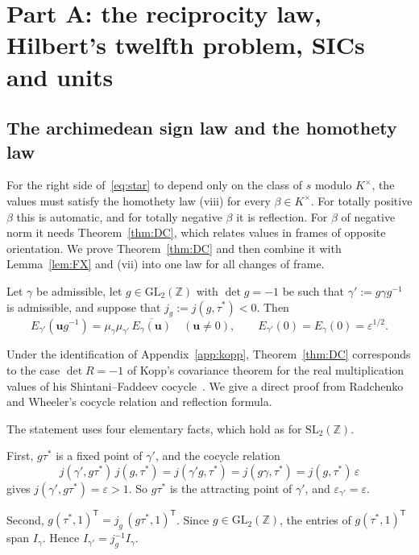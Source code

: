 \documentclass[11pt]{amsart}
\numberwithin{equation}{section}
\theoremstyle{plain}
\newenvironment{lthm}[1]{\renewcommand\thelthminner{#1}\lthminner}{\endlthminner}
\theoremstyle{definition}
\theoremstyle{remark}
\begin{document}
\section{Part A: the reciprocity law, Hilbert's twelfth problem, SICs and units}\label{sec:partA}

\subsection{The archimedean sign law and the homothety law}\label{sec:sign}

For the right side of~\eqref{eq:star} to depend only on the class of \(s\) modulo \(K^\times\), the values must satisfy the homothety law (viii) for every \(\beta\in K^\times\). For totally positive \(\beta\) this is automatic, and for totally negative \(\beta\) it is reflection. For \(\beta\) of negative norm it needs Theorem~\ref{thm:DC}, which relates values in frames of opposite orientation. We prove Theorem~\ref{thm:DC} and then combine it with Lemma~\ref{lem:FX} and (vii) into one law for all changes of frame.

\begin{lthm}{DC}[Det \(-1\) covariance]\label{thm:DC}
Let \(\gamma\) be admissible, let \(g\in\mathrm{GL}_2(\mathbb Z)\) with \(\det g=-1\) be such that \(\gamma':=g\gamma g^{-1}\) is admissible, and suppose that \(j_g:=j(g,\tau^*)<0\). Then
\[E_{\gamma'}(\mathbf ug^{-1})=\mu_\gamma\mu_{\gamma'}\,\overline{E_\gamma(\mathbf u)}\quad(\mathbf u\ne0),\qquad E_{\gamma'}(0)=E_\gamma(0)=\varepsilon^{1/2}.\]
\end{lthm}

Under the identification of Appendix~\ref{app:kopp}, Theorem~\ref{thm:DC} corresponds to the case $\det R=-1$ of Kopp's covariance theorem for the real multiplication values of his Shintani--Faddeev cocycle~\cite[Thm.~4.37]{Ko}. We give a direct proof from Radchenko and Wheeler's cocycle relation and reflection formula.

The statement uses four elementary facts, which hold as for \(\mathrm{SL}_2(\mathbb Z)\).

First, \(g\tau^*\) is a fixed point of \(\gamma'\), and the cocycle relation
\[j(\gamma',g\tau^*)\,j(g,\tau^*)=j(\gamma'g,\tau^*)=j(g\gamma,\tau^*)=j(g,\tau^*)\,\varepsilon\]
gives \(j(\gamma',g\tau^*)=\varepsilon>1\). So \(g\tau^*\) is the attracting point of \(\gamma'\), and \(\varepsilon_{\gamma'}=\varepsilon\).

Second, \(g(\tau^*,1)^{\mathsf T}=j_g\,(g\tau^*,1)^{\mathsf T}\). Since \(g\in\mathrm{GL}_2(\mathbb Z)\), the entries of \(g(\tau^*,1)^{\mathsf T}\) span \(I_\gamma\). Hence \(I_{\gamma'}=j_g^{-1}I_\gamma\).
\end{document}
